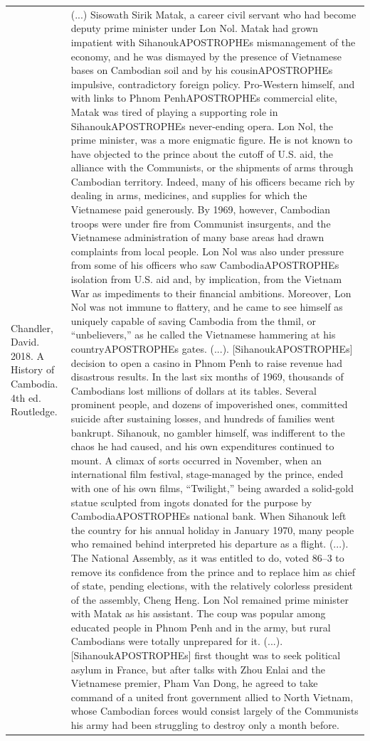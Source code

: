 {\begin{longtable}{p{}p{}}
\\
Chandler, David. 2018. A History of Cambodia. 4th ed. Routledge. & (...) Sisowath Sirik Matak, a career civil servant who had become deputy prime minister under Lon Nol. Matak had grown impatient with SihanoukAPOSTROPHEs mismanagement of the economy, and he was dismayed by the presence of Vietnamese bases on Cambodian soil and by his cousinAPOSTROPHEs impulsive, contradictory foreign policy. Pro-Western himself, and with links to Phnom PenhAPOSTROPHEs commercial elite, Matak was tired of playing a supporting role in SihanoukAPOSTROPHEs never-ending opera. Lon Nol, the prime minister, was a more enigmatic figure. He is not known to have objected to the prince about the cutoff of U.S. aid, the alliance with the Communists, or the shipments of arms through Cambodian territory. Indeed, many of his officers became rich by dealing in arms, medicines, and supplies for which the Vietnamese paid generously. By 1969, however, Cambodian troops were under fire from Communist insurgents, and the Vietnamese administration of many base areas had drawn complaints from local people. Lon Nol was also under pressure from some of his officers who saw CambodiaAPOSTROPHEs isolation from U.S. aid and, by implication, from the Vietnam War as impediments to their financial ambitions. Moreover, Lon Nol was not immune to flattery, and he came to see himself as uniquely capable of saving Cambodia from the thmil, or “unbelievers,” as he called the Vietnamese hammering at his countryAPOSTROPHEs gates. (...). [SihanoukAPOSTROPHEs] decision to open a casino in Phnom Penh to raise revenue had disastrous results. In the last six months of 1969, thousands of Cambodians lost millions of dollars at its tables. Several prominent people, and dozens of impoverished ones, committed suicide after sustaining losses, and hundreds of families went bankrupt. Sihanouk, no gambler himself, was indifferent to the chaos he had caused, and his own expenditures continued to mount. A climax of sorts occurred in November, when an international film festival, stage-managed by the prince, ended with one of his own films, “Twilight,” being awarded a solid-gold statue sculpted from ingots donated for the purpose by CambodiaAPOSTROPHEs national bank. When Sihanouk left the country for his annual holiday in January 1970, many people who remained behind interpreted his departure as a flight. (...). The National Assembly, as it was entitled to do, voted 86–3 to remove its confidence from the prince and to replace him as chief of state, pending elections, with the relatively colorless president of the assembly, Cheng Heng. Lon Nol remained prime minister with Matak as his assistant. The coup was popular among educated people in Phnom Penh and in the army, but rural Cambodians were totally unprepared for it. (...). [SihanoukAPOSTROPHEs] first thought was to seek political asylum in France, but after talks with Zhou Enlai and the Vietnamese premier, Pham Van Dong, he agreed to take command of a united front government allied to North Vietnam, whose Cambodian forces would consist largely of the Communists his army had been struggling to destroy only a month before.
\\
\end{longtable}}
